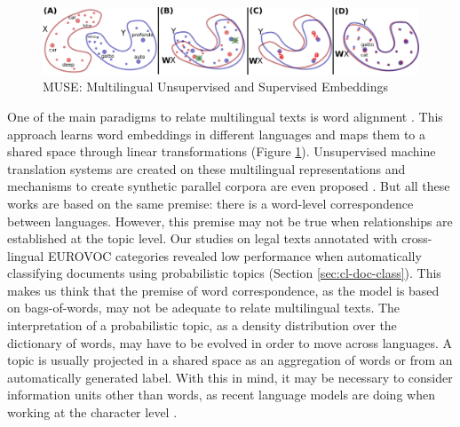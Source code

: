 \begin{figure}[ht]
    \centering
    \includegraphics[width=\linewidth]{muse.png}
    \caption{MUSE: Multilingual Unsupervised and Supervised Embeddings \citep{Lample2018}}
    \label{fig:muse}
\end{figure}


One of the main paradigms to relate multilingual texts is word alignment \citep{joulin2018loss, Lample2018}. This approach learns word embeddings in different languages and maps them to a shared space through linear transformations (Figure \ref{fig:muse}). Unsupervised machine translation systems are created on these multilingual representations and mechanisms to create synthetic parallel corpora are even proposed \citep{artetxe2019}. But all these works are based on the same premise: there is a word-level correspondence between languages. However, this premise may not be true when relationships are established at the topic level. Our studies on legal texts annotated with cross-lingual EUROVOC categories revealed low performance when automatically classifying documents using probabilistic topics (Section \ref{sec:cl-doc-class}). This makes us think that the premise of word correspondence, as the model is based on bags-of-words, may not be adequate to relate multilingual texts. The interpretation of a probabilistic topic, as a density distribution over the dictionary of words, may have to be evolved in order to move across languages. A topic is usually projected in a shared space as an aggregation of words or from an automatically generated label. With this in mind, it may be necessary to consider information units other than words, as recent language models are doing when working at the character level \citep{Al-Rfou_Choe_Constant_Guo_Jones_2019}.


